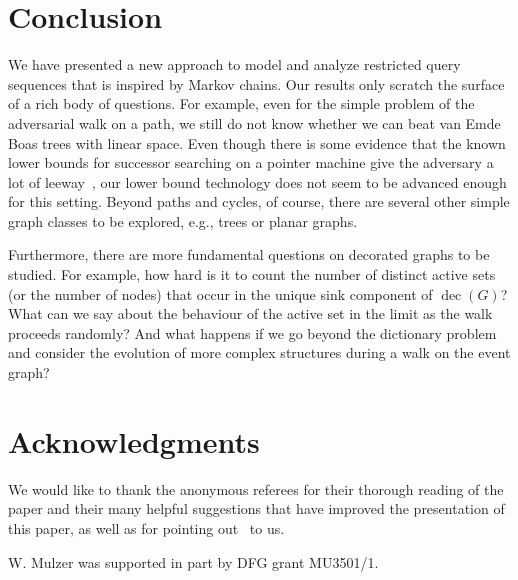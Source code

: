 \documentclass[oribibl,envcountsect,envcountsame]{llncs}
\DeclareMathOperator{\dec}{dec}
\begin{document}
\section{Conclusion}

We have presented a new approach to model and analyze restricted
query sequences that is inspired by Markov chains. 
Our results only scratch the surface of a rich body of questions.
For example, even for the simple problem of the adversarial walk
on a path, we still do not know whether we can beat van Emde
Boas trees with linear space. Even though there is some 
evidence that the known lower bounds for successor searching
on a pointer machine
give the adversary a lot of leeway~\cite{Mulzer09}, our
lower bound technology
does not seem to be advanced enough for this setting.
Beyond paths and cycles, of course, there are several other
simple graph classes to be explored, e.g., trees or planar
graphs.

Furthermore, there are more fundamental questions on decorated
graphs to be studied. For example, how hard is it to count
the number of distinct active sets (or the number of nodes) 
that occur in the unique sink component of $\dec(G)$? 
What can we say about the  behaviour of the active
set in the limit as the walk proceeds randomly? And what happens
if we go beyond the dictionary problem and consider the evolution
of more complex structures during a walk on the event graph?

\section*{Acknowledgments}
We would like to thank the anonymous referees for their thorough
reading of the paper and their many helpful suggestions that have
improved the presentation of this paper, as well
as for pointing out~\cite{CrochemoreIlKuRaWa12} to us.

W. Mulzer was supported in part by DFG grant MU3501/1.



\end{document}
